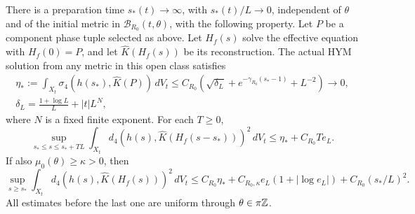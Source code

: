 \begin{theorem}\label{thm:spatial-entry}
There is a preparation time $s_*(t)\to\infty$, with $s_*(t)/L\to0$,
independent of $\theta$ and of the initial metric in
$\mathcal B_{R_0}(t,\theta)$, with the following property.
Let $P$ be a component phase tuple selected as above. Let $H_f(s)$
solve the effective equation with $H_f(0)=P$, and let
$\widehat K(H_f(s))$ be its reconstruction. The actual HYM solution
from any metric in this open class satisfies
\begin{equation}\label{eq:entry-eta}
 \begin{gathered}
 \eta_*:=\int_{X_t}\sigma_4(h(s_*),\widehat K(P))\,dV_t
     \le C_{R_0}\left(\sqrt{\delta_L}
          +e^{-\gamma_{R_0}(s_*-1)}+L^{-2}\right)\longrightarrow0,\\
 \delta_L=\frac{1+\log L}{L}+|t|L^N,
 \end{gathered}
\end{equation}
where $N$ is a fixed finite exponent. For each $T\ge0$,
\begin{equation}\label{eq:spatial-bounded}
 \sup_{s_*\le s\le s_*+TL}\int_{X_t}
 d_4(h(s),\widehat K(H_f(s-s_*)))^2\,dV_t
       \le \eta_*+C_{R_0}Te_L.
\end{equation}
If also $\mu_0(\theta)\ge\kappa>0$, then
\begin{equation}\label{eq:spatial-alltime}
 \sup_{s\ge s_*}\int_{X_t}d_4(h(s),\widehat K(H_f(s)))^2\,dV_t
 \le C_{R_0}\eta_*+C_{R_0,\kappa}e_L(1+|\log e_L|)
                 +C_{R_0}(s_*/L)^2.
\end{equation}
All estimates before the last one are uniform through
$\theta\in\pi\mathbb Z$.
\end{theorem}

